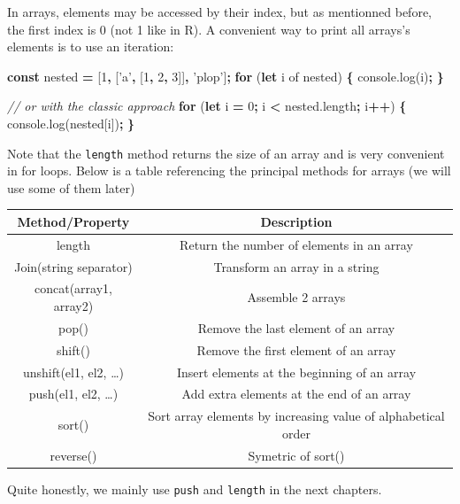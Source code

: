 \documentclass[]{book}
\newenvironment{Shaded}{\begin{snugshade}}{\end{snugshade}}
\newcommand{\AttributeTok}[1]{\textcolor[rgb]{0.77,0.63,0.00}{#1}}
\newcommand{\CommentTok}[1]{\textcolor[rgb]{0.56,0.35,0.01}{\textit{#1}}}
\newcommand{\ControlFlowTok}[1]{\textcolor[rgb]{0.13,0.29,0.53}{\textbf{#1}}}
\newcommand{\DecValTok}[1]{\textcolor[rgb]{0.00,0.00,0.81}{#1}}
\newcommand{\KeywordTok}[1]{\textcolor[rgb]{0.13,0.29,0.53}{\textbf{#1}}}
\newcommand{\NormalTok}[1]{#1}
\newcommand{\OperatorTok}[1]{\textcolor[rgb]{0.81,0.36,0.00}{\textbf{#1}}}
\newcommand{\StringTok}[1]{\textcolor[rgb]{0.31,0.60,0.02}{#1}}
\newcommand{\VariableTok}[1]{\textcolor[rgb]{0.00,0.00,0.00}{#1}}
\begin{document}
In arrays, elements may be accessed by their index, but as mentionned before, the first index is 0 (not 1 like in R). A convenient way to print all arrays's elements is to use an iteration:

\begin{Shaded}
\begin{Highlighting}[]
\KeywordTok{const}\NormalTok{ nested }\OperatorTok{=}\NormalTok{ [}\DecValTok{1}\OperatorTok{,}\NormalTok{ [}\StringTok{'a'}\OperatorTok{,}\NormalTok{ [}\DecValTok{1}\OperatorTok{,} \DecValTok{2}\OperatorTok{,} \DecValTok{3}\NormalTok{]]}\OperatorTok{,} \StringTok{'plop'}\NormalTok{]}\OperatorTok{;}
\ControlFlowTok{for}\NormalTok{ (}\KeywordTok{let}\NormalTok{ i of nested) }\OperatorTok{\{}
  \VariableTok{console}\NormalTok{.}\AttributeTok{log}\NormalTok{(i)}\OperatorTok{;}
\OperatorTok{\}}

\CommentTok{// or with the classic approach}
\ControlFlowTok{for}\NormalTok{ (}\KeywordTok{let}\NormalTok{ i }\OperatorTok{=} \DecValTok{0}\OperatorTok{;}\NormalTok{ i }\OperatorTok{<} \VariableTok{nested}\NormalTok{.}\AttributeTok{length}\OperatorTok{;}\NormalTok{ i}\OperatorTok{++}\NormalTok{) }\OperatorTok{\{}
  \VariableTok{console}\NormalTok{.}\AttributeTok{log}\NormalTok{(nested[i])}\OperatorTok{;}
\OperatorTok{\}}
\end{Highlighting}
\end{Shaded}

Note that the \texttt{length} method returns the size of an array and is very convenient in for loops. Below is a table referencing the principal methods for arrays (we will use some of them later)

\begin{longtable}[]{@{}cc@{}}
\toprule
Method/Property & Description\tabularnewline
\midrule
\endhead
length & Return the number of elements in an array\tabularnewline
Join(string separator) & Transform an array in a string\tabularnewline
concat(array1, array2) & Assemble 2 arrays\tabularnewline
pop() & Remove the last element of an array\tabularnewline
shift() & Remove the first element of an array\tabularnewline
unshift(el1, el2, \ldots{}) & Insert elements at the beginning of an array\tabularnewline
push(el1, el2, \ldots{}) & Add extra elements at the end of an array\tabularnewline
sort() & Sort array elements by increasing value of alphabetical order\tabularnewline
reverse() & Symetric of sort()\tabularnewline
\bottomrule
\end{longtable}

Quite honestly, we mainly use \texttt{push} and \texttt{length} in the next chapters.
\end{document}
